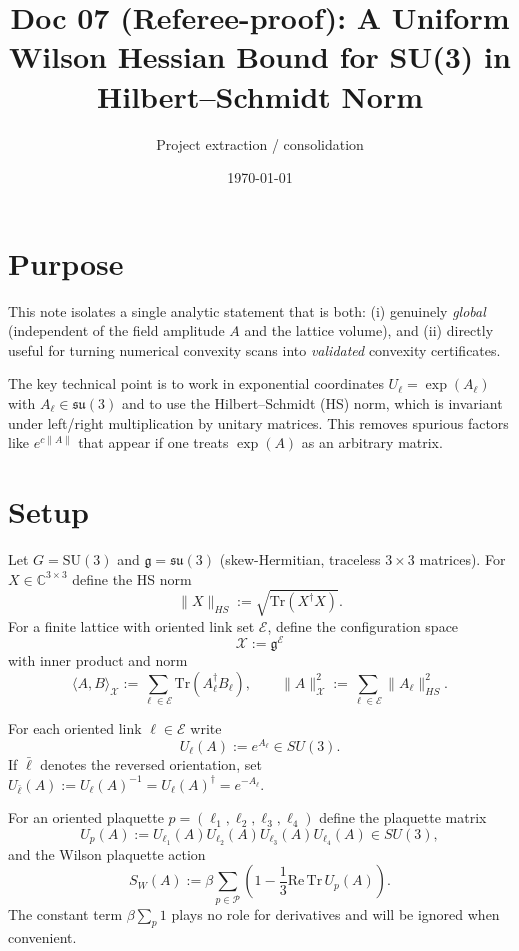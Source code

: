\documentclass[11pt]{article}
\title{Doc 07 (Referee-proof): A Uniform Wilson Hessian Bound for SU(3) in Hilbert--Schmidt Norm}
\author{Project extraction / consolidation}
\date{\today}
\begin{document}
\maketitle

\section{Purpose}

This note isolates a single analytic statement that is both:
(i) genuinely \emph{global} (independent of the field amplitude $A$ and the lattice volume), and
(ii) directly useful for turning numerical convexity scans into \emph{validated} convexity certificates.

The key technical point is to work in exponential coordinates $U_\ell = \exp(A_\ell)$ with $A_\ell\in\mathfrak{su}(3)$ and to use the Hilbert--Schmidt (HS) norm, which is invariant under left/right multiplication by unitary matrices. This removes spurious factors like $e^{c\|A\|}$ that appear if one treats $\exp(A)$ as an arbitrary matrix.

\section{Setup}

Let $G=\mathrm{SU}(3)$ and $\mathfrak{g}=\mathfrak{su}(3)$ (skew-Hermitian, traceless $3\times 3$ matrices).
For $X\in\mathbb{C}^{3\times 3}$ define the HS norm
\[
\|X\|_{HS} := \sqrt{\mathrm{Tr}(X^\dagger X)}.
\]
For a finite lattice with oriented link set $\mathcal{E}$, define the configuration space
\[
\mathcal{X} := \mathfrak{g}^{\mathcal{E}}
\]
with inner product and norm
\[
\langle A,B\rangle_{\mathcal{X}} := \sum_{\ell\in\mathcal{E}} \mathrm{Tr}(A_\ell^\dagger B_\ell),
\qquad
\|A\|_{\mathcal{X}}^2 := \sum_{\ell\in\mathcal{E}} \|A_\ell\|_{HS}^2.
\]

For each oriented link $\ell\in\mathcal{E}$ write
\[
U_\ell(A) := e^{A_\ell}\in SU(3).
\]
If $\bar\ell$ denotes the reversed orientation, set $U_{\bar\ell}(A) := U_\ell(A)^{-1} = U_\ell(A)^\dagger = e^{-A_\ell}$.

For an oriented plaquette $p=(\ell_1,\ell_2,\ell_3,\ell_4)$ define the plaquette matrix
\[
U_p(A) := U_{\ell_1}(A)U_{\ell_2}(A)U_{\ell_3}(A)U_{\ell_4}(A)\in SU(3),
\]
and the Wilson plaquette action
\[
S_W(A) := \beta \sum_{p\in\mathcal{P}} \left(1-\frac{1}{3}\mathrm{Re\,Tr}\,U_p(A)\right).
\]
The constant term $\beta\sum_p 1$ plays no role for derivatives and will be ignored when convenient.
\end{document}
